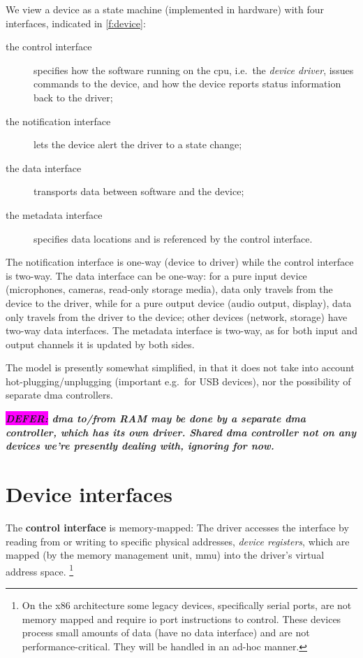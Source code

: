 \documentclass[a4paper,12pt]{report}
\newcommand{\DEFER}[1]{\textbf{\textsl{\colorbox{magenta}{DEFER:} #1}}}
\newcommand{\DEFER}[1]{\relax}
\begin{document}
We view a device as a state machine (implemented in hardware) with four interfaces, indicated
in \autoref{f:device}:
\begin{description}
\item[the control interface] specifies how the software running on the
  \gls{cpu}, i.e.\ the \emph{device driver}, issues commands to
  the device, and how the device reports status information back to the driver;
\item [the notification interface] lets the device alert the driver to a
  state change;
\item [the data interface] transports data between software and the
  device;
\item[the metadata interface] specifies data locations and is
  referenced by the control interface.
\end{description}

The notification interface is one-way (device to driver) while the
control interface is two-way. The data interface can be one-way: for a
pure  input device (microphones, cameras, read-only storage media), data only travels from
the device to the driver, while for a pure output device
(audio output, display), data only
travels from the driver to the device; other devices (network,
storage) have two-way data interfaces. The metadata interface is
two-way, as for both input and output channels it is updated by both
sides.

The model is presently somewhat simplified, in that it does not take
into account hot-plugging/unplugging (important e.g.\ for USB devices),
nor the possibility of separate \gls{dma} controllers.

\DEFER{\gls{dma} to/from RAM may be done by a separate \gls{dma} controller,
  which has its own driver. Shared \gls{dma} controller not on any devices
  we're presently dealing with, ignoring for now.}

\section{Device interfaces}

The \textbf{control interface} is memory-mapped: The driver accesses the
interface by reading from or writing to specific physical addresses,
\emph{device registers}, which are mapped (by the memory management
unit, \gls{mmu}) into the driver's virtual address space.%
\footnote{On the x86 architecture some legacy devices, specifically
  serial ports, are not memory mapped and require \gls{io} port instructions to
  control.  These devices process small amounts of data (have no data
  interface) and are not performance-critical. They will be handled in
  an ad-hoc manner.}
\end{document}
